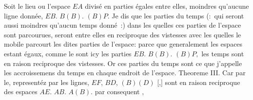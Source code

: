 \pstart%
\pend
\pstart
\noindent%
\protect{}\protect{}
\pend
\pstart
\noindent%
Soit le lieu ou l'espace $\displaystyle EA$ divis\'{e} en parties \'{e}gales entre elles,
moindres qu'aucune ligne donn\'{e}e, $\displaystyle EB.$ $\displaystyle B(B).$ $\displaystyle (B)P$.
Je dis que les parties du temps
(:~qui seront aussi moindres qu'aucun temps donn\'{e}~:)
dans les quelles ces parties de l'espace sont parcourues,
seront entre elles en
reciproque des vistesses avec les quelles le mobile parcourt les dites parties de l'espace:
parce que generalement les espaces estant \'{e}gaux,
comme le sont icy les parties $\displaystyle EB.$ $\displaystyle B(B).$ $\displaystyle (B)P,$
les temps sont en raison reciproque des vistesses.
Or ces parties du temps sont ce que j'appelle les accroissemens du temps en chaque endroit de l'espace.
\pend
\pstart%
Theoreme III.
\pend
\pstart
\noindent%
\sloppy {}
\pend
\count{}
\pstart
\noindent%
Car par le,
represent\'{e}z par les lignes, $\displaystyle EF$, $\displaystyle BD$, $\displaystyle (B)(D)$
[,]
sont en raison reciproque des espaces $\displaystyle AE.$ $\displaystyle AB.$ $\displaystyle A(B).$
par consequent ,
